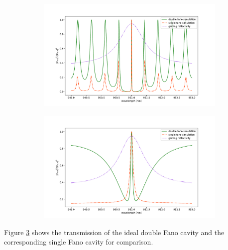 \begin{figure}[h!]
    \centering
    \begin{subfigure}[c]{0.49\textwidth}
        \centering
        \includegraphics[width=\textwidth]{figures/single_and_double_1000um.pdf}
        \caption{}
        \label{fig:double_in_standard_regime}
    \end{subfigure}
    \begin{subfigure}[c]{0.49\textwidth}
        \includegraphics[width=\textwidth]{figures/single_and_double_5um.pdf}
        \caption{}
        \label{fig:double_in_fano_regime}
    \end{subfigure}
    \caption{}
    \label{fig:double_in_standard_and_fano_regimes}
\end{figure}

Figure \ref{fig:double_in_standard_and_fano_regimes} shows the transmission of the ideal double Fano cavity and the corresponding single Fano cavity for comparison. 

